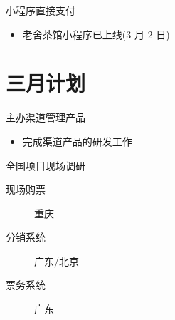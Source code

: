 \documentclass[presentation, bigger]{beamer}
\begin{document}
\begin{frame}[label={sec:orgf435c4d}]{小程序直接支付}
\begin{itemize}
\item 老舍茶馆小程序已上线(3 月 2 日)
\end{itemize}
\end{frame}


\section{三月计划}
\label{sec:org143ebbb}

\begin{frame}[label={sec:orgef29eb8}]{主办渠道管理产品}
\begin{itemize}
\item 完成渠道产品的研发工作
\end{itemize}
\end{frame}

\begin{frame}[label={sec:org94a07e8}]{全国项目现场调研}
\begin{description}
\item[{现场购票}] 重庆
\item[{分销系统}] 广东/北京
\item[{票务系统}] 广东
\end{description}
\end{frame}
\end{document}
